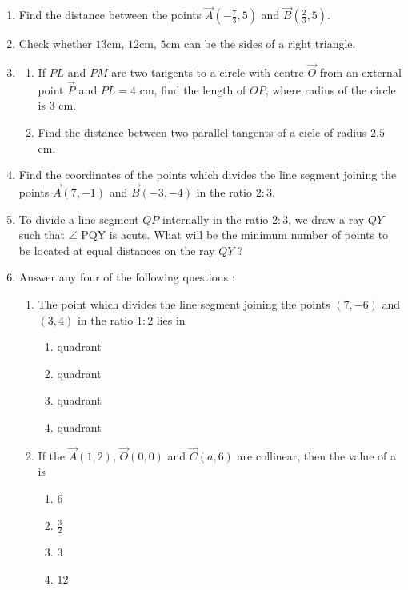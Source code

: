 \begin{enumerate}
	\item Find the distance between the points $\vec{A}(-\frac{7}{3},5)$ and $\vec{B}(\frac{2}{3},5)$.                  	\item Check whether $13$cm, $12$cm, $5$cm can be the sides of a right triangle.
	\item \begin{enumerate}
			\item If $PL$ and $PM$ are two tangents to a circle with centre $\vec{O}$ from an external point $\vec{P}$ and $PL=4$ cm, find the length of $OP$, where radius of the circle is 3 cm.
		\item Find the distance between two parallel tangents of a cicle of radius $2.5$ cm.
             \end{enumerate}
     \item Find the coordinates of the points which divides the line segment joining the points $\vec{A}(7,-1)$ and $\vec{B}(-3,-4)$ in the ratio $2:3$.	
     \item To divide a line segment $QP$ internally in the ratio $2:3$, we draw a ray $QY$ such that $\angle$ PQY is acute. What will be  the minimum number of points to be located at equal distances on the ray $QY$ ?
     \item Answer any four of the following questions :
	     \begin{enumerate}[label=(\roman*)]
		     \item The point which divides the line segment joining the points $(7,-6)$ and $(3,4)$ in the ratio $1:2$ lies in
			     \begin{enumerate}
                              \item {} quadrant
			      \item {} quadrant
			      \item {} quadrant
			      \item {} quadrant
			     \end{enumerate}
		     \item If the $\vec{A}(1, 2)$, $\vec{O}(0, 0)$ and $\vec{C}(a, 6)$ are collinear, then the value of a is
			     \begin{enumerate}[label=(\Alph*)]
				     \item $6$
				     \item $\frac{3}{2}$
				     \item $3$
				     \item $12$

\end{enumerate}
\end{enumerate}
\end{enumerate}
